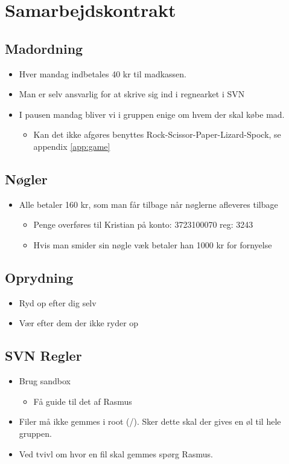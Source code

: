\documentclass{article}
\begin{document}
\section{Samarbejdskontrakt}
\subsection{Madordning}
\begin{itemize}
	\item Hver mandag indbetales 40 kr til madkassen.
	\item Man er selv ansvarlig for at skrive sig ind i regnearket i SVN
	\item I pausen mandag bliver vi i gruppen enige om hvem der skal k\o{}be mad.
	
	\begin{itemize}
		\item Kan det ikke afg\o{}res benyttes Rock-Scissor-Paper-Lizard-Spock, se appendix \ref{app:game}
	\end{itemize}
\end{itemize}

\subsection{N\o{}gler}
\begin{itemize}
	\item Alle betaler 160 kr, som man f\aa{}r tilbage n\aa{}r n\o{}glerne afleveres tilbage
	\begin{itemize}
		\item Penge overf\o{}res til Kristian på konto: 3723100070 reg: 3243
		\item Hvis man smider sin n\o{}gle v\ae{}k betaler han 1000 kr for fornyelse
	\end{itemize}
\end{itemize}

\subsection{Oprydning}
\begin{itemize}
	\item Ryd op efter dig selv
	\item V\ae{}r efter dem der ikke ryder op
\end{itemize}

\subsection{SVN Regler}
\begin{itemize}
	\item Brug sandbox
	\begin{itemize}
		\item F\aa{} guide til det af Rasmus
	\end{itemize}
	\item Filer m\aa{} ikke gemmes i root (/). Sker dette skal der gives en \o{}l til hele gruppen.
	\item Ved tvivl om hvor en fil skal gemmes sp\o{}rg Rasmus.
\end{itemize}
\end{document}
